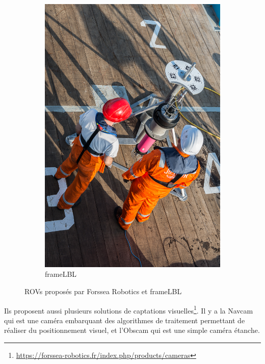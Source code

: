 \begin{figure}[!htb]
\begin{subfigure}[b]{0.3\textwidth}
            \includegraphics[width=\textwidth]{imgs/Frame.jpg}
            \caption{\gls{frameLBL}}
        \end{subfigure}
        \caption{\gls{ROV}s proposés par Forssea Robotics et \gls{frameLBL}}
        \label{fig:ROVs}
    \end{figure}

    Ils proposent aussi plusieurs solutions de captations visuelles\footnote{\url{https://forssea-robotics.fr/index.php/products/cameras}}. Il y a la \gls{Navcam} qui est une caméra embarquant des algorithmes de traitement permettant de réaliser du positionnement visuel, et l'\gls{Obscam} qui est une simple caméra étanche.